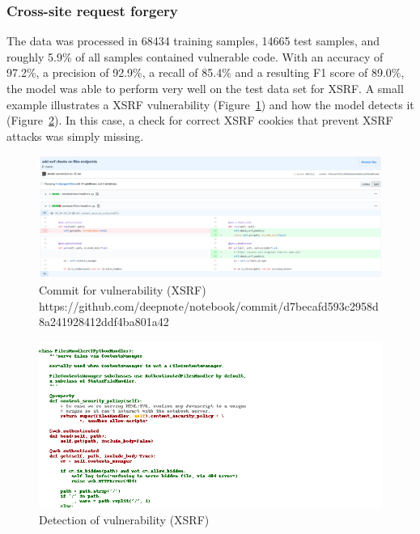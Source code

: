 \documentclass[
a4paper,
pagesize,
pdftex,
12pt,
ngerman,
fleqn,
final,
]{scrartcl}
\begin{document}
	\newpage
	
	\subsubsection{Cross-site request forgery}
	The data was processed in 68434 training samples, 14665 test samples, and roughly 5.9\% of all samples contained vulnerable code. With an accuracy of 97.2\%, a precision of 92.9\%, a recall of 85.4\% and a resulting F1 score of 89.0\%, the model was able to perform very well on the test data set for XSRF. A small example illustrates a XSRF vulnerability (Figure~\ref{fig:xsrfA}) and how the model detects it (Figure~\ref{fig:xsrfAr}). In this case, a check for correct XSRF cookies that prevent XSRF attacks was simply missing.
	
	\begin{figure}[H]
		\centering
		\includegraphics[width=\linewidth]{Images/xsrfA}
		\caption{Commit for vulnerability (XSRF) \newline \scriptsize{https://github.com/deepnote/notebook/commit/d7becafd593c2958d8a241928412ddf4ba801a42
		}}
		\label{fig:xsrfA}
	\end{figure}
	\begin{figure}[H]
		\centering
		\includegraphics[width=\linewidth]{Images/xsrfAr}
		\caption{Detection of vulnerability (XSRF)}
		\label{fig:xsrfAr}
	\end{figure}
\end{document}
